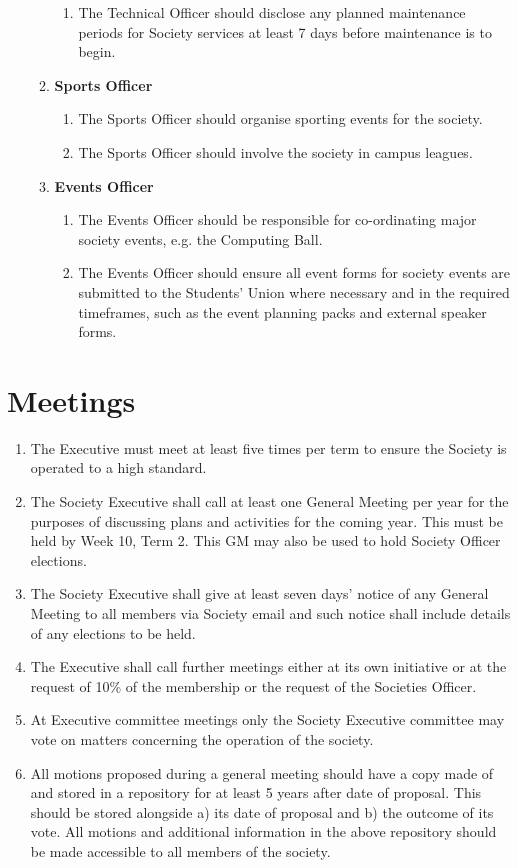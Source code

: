 \documentclass{article}
\begin{document}
\begin{enumerate}
\begin{enumerate}
\begin{enumerate}
            \item The Technical Officer should disclose any planned maintenance periods for Society services at least 7 days before maintenance is to begin.
        \end{enumerate}
        \item \textbf{Sports Officer}
        \begin{enumerate}
            \item The Sports Officer should organise sporting events for the society.
            \item The Sports Officer should involve the society in campus leagues.
        \end{enumerate}
        \item \textbf{Events Officer}
        \begin{enumerate}
            \item The Events Officer should be responsible for co-ordinating major society events, e.g. the Computing Ball.
            \item The Events Officer should ensure all event forms for society events are submitted to the Students’ Union where necessary and in the required timeframes, such as the event planning packs and external speaker forms.
        \end{enumerate}
    \end{enumerate}
\end{enumerate}

\section{Meetings}
\begin{enumerate}
    \item The Executive must meet at least five times per term to ensure the Society is operated to a high standard.
    \item The Society Executive shall call at least one General Meeting per year for the purposes of discussing plans and activities for the coming year. This must be held by Week 10, Term 2. This GM may also be used to hold Society Officer elections.
    \item The Society Executive shall give at least seven days’ notice of any General Meeting to all members via Society email and such notice shall include details of any elections to be held.
    \item The Executive shall call further meetings either at its own initiative or at the request of 10\% of the membership or the request of the Societies Officer.
    \item At Executive committee meetings only the Society Executive committee may vote on matters concerning the operation of the society.
    \item All motions proposed during a general meeting should have a copy made of and stored in a repository for at least 5 years after date of proposal. This should be stored alongside a) its date of proposal and b) the outcome of its vote. All motions and additional information in the above repository should be made accessible to all members of the society.
\end{enumerate}
\end{document}
